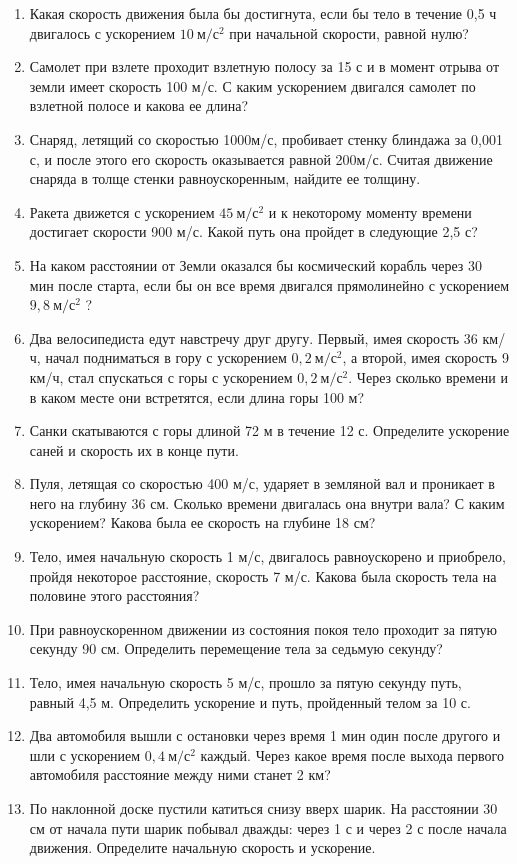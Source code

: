 \documentclass[a6paper, 11pt]{diss_4}
\renewcommand{\'}{\,'}
\begin{document}
\begin{enumerate}
\item Какая   скорость    движения   была   бы достигнута,   если   бы   тело   в   течение   0,5  ч двигалось с ускорением $10\ м/с^2$ при начальной скорости, равной нулю?
\item Самолет  при   взлете   проходит   взлетную  полосу  за 15 с и  в  момент отрыва от земли   имеет   скорость    100   м/с. С каким ускорением   двигался   самолет   по   взлетной полосе и какова ее длина?
\item Снаряд, летящий со скоростью 1000м/с, пробивает   стенку   блиндажа   за 0,001   с,  и  после этого его скорость  оказывается   равной 200м/с.   Считая    движение снаряда   в   толще   стенки   равноускоренным, найдите ее толщину.
\item Ракета движется с ускорением $45\ м/с^2$ и к некоторому моменту времени достигает скорости  900  м/с.  Какой   путь  она  пройдет в следующие 2,5 с?
\item На   каком   расстоянии от Земли оказался бы космический корабль через 30 мин после старта, если бы он все время двигался  прямолинейно с ускорением $9,8\ м/с^2$ ?
\item Два велосипедиста едут навстречу друг другу. Первый, имея скорость 36 км/ч, начал подниматься в гору с ускорением $0,2\ м/с^2$, а второй, имея скорость 9 км/ч, стал спускаться с горы с ускорением $0,2\ м/с^2$. Через сколько времени и в каком месте они встретятся, если длина горы 100 м?
\item Санки скатываются с горы длиной 72 м в течение 12 с. Определите ускорение саней и скорость их в конце пути.
\item Пуля, летящая со скоростью 400 м/с, ударяет в земляной вал и проникает в него на глубину 36 см. Сколько времени двигалась она внутри вала? С каким ускорением? Какова была ее скорость на глубине 18 см?
\item Тело, имея начальную скорость 1 м/с, двигалось равноускорено и приобрело, пройдя некоторое расстояние, скорость 7 м/с. Какова была скорость тела на половине этого расстояния?
\item При равноускоренном движении из состояния покоя тело проходит за пятую секунду 90 см. Определить перемещение тела за седьмую секунду?
\item Тело, имея начальную скорость 5 м/с, прошло за пятую секунду путь, равный 4,5 м. Определить ускорение и путь, пройденный телом за 10 с.
\item Два автомобиля вышли с остановки через время 1 мин один после другого и шли с ускорением $0,4\ м/с^2$ каждый. Через какое время после выхода первого автомобиля расстояние между ними станет 2 км?
\item По наклонной доске пустили катиться снизу вверх шарик. На расстоянии 30 см от начала пути шарик побывал дважды: через 1 с и через 2 с после начала движения. Определите начальную скорость и ускорение.
\end{enumerate}
\end{document}
